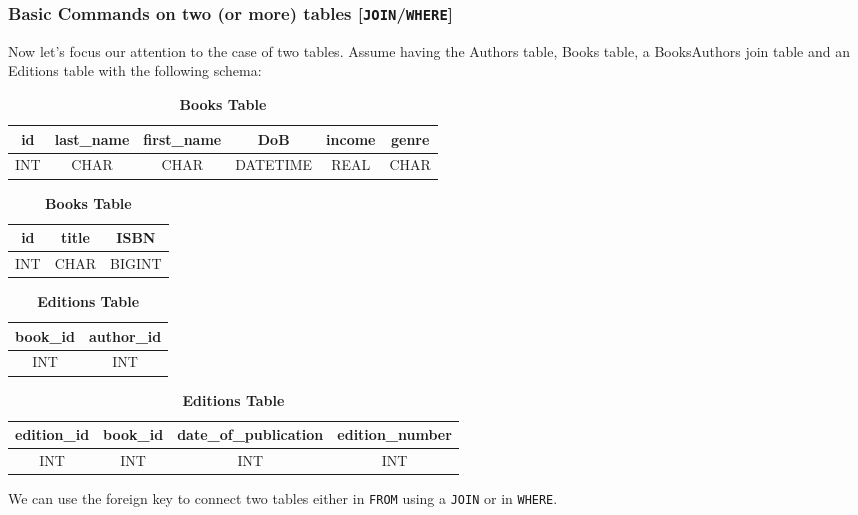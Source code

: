 \documentclass[a4page, 11pt]{article}
\theoremstyle{definition}
\begin{document}
\subsubsection{Basic Commands on two (or more) tables [\texttt{JOIN}/\texttt{WHERE}]}
Now let's focus our attention to the case of two tables. Assume having the Authors table, Books table, a BooksAuthors join table and an Editions table with the following schema:
\begin{table}[h] %
\hspace*{1cm}
  \begin{minipage}{.5\linewidth}
\centering

	\begin{tabular}{c| c| c| c| c| c}
	id & last\_name & first\_name & DoB & income & genre\\
	\hline
	INT & CHAR & CHAR & DATETIME & REAL & CHAR
	\end{tabular}
\caption*{\textbf{Authors Table}}
\end{minipage}
  \begin{minipage}{.5\linewidth}
 	\centering
	\begin{tabular}{c |c| c}
	id & title & ISBN\\
	\hline
	INT & CHAR & BIGINT
	\end{tabular}
\caption*{\textbf{Books Table}}
	\end{minipage}
\end{table}
\begin{table}[h] 
\hspace*{-2cm}
  \begin{minipage}{.5\linewidth}
 	\centering
	\begin{tabular}{c| c}
	book\_id & author\_id\\
	\hline
	INT & INT
	\end{tabular}
\caption*{\textbf{BookAuthors Table}}
\end{minipage}
\begin{minipage}{.5\linewidth}
	\begin{tabular}{c |c |c |c}
	edition\_id & book\_id & date\_of\_publication & edition\_number\\
	\hline
	INT & INT & INT & INT
\end{tabular}
\caption*{\textbf{Editions Table}}
\end{minipage}
\end{table}

We can use the foreign key to connect two tables either in \texttt{FROM} using a \texttt{JOIN} or in \texttt{WHERE}.
\end{document}
